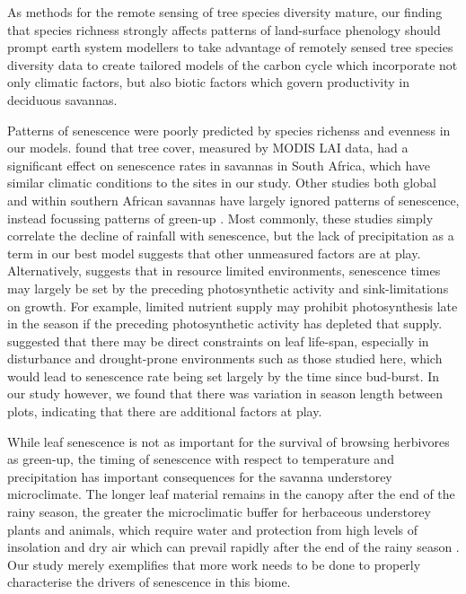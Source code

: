 \documentclass[11pt,a4paper]{article}
\begin{document}
As methods for the remote sensing of tree species diversity mature, our finding that species richness strongly affects patterns of land-surface phenology should prompt earth system modellers to take advantage of remotely sensed tree species diversity data to create tailored models of the carbon cycle which incorporate not only climatic factors, but also biotic factors which govern productivity in deciduous savannas. 

Patterns of senescence were poorly predicted by species richenss and evenness in our models. \citet{Cho2017} found that tree cover, measured by MODIS LAI data, had a significant effect on senescence rates in savannas in South Africa, which have similar climatic conditions to the sites in our study. Other studies both global and within southern African savannas have largely ignored patterns of senescence, instead focussing patterns of green-up \citep{Gallinat2015}. Most commonly, these studies simply correlate the decline of rainfall with senescence, but the lack of precipitation as a term in our best model suggests that other unmeasured factors are at play. Alternatively, \citet{Zani2020} suggests that in resource limited environments, senescence times may largely be set by the preceding photosynthetic activity and sink-limitations on growth. For example, limited nutrient supply may prohibit photosynthesis late in the season if the preceding photosynthetic activity has depleted that supply. \citet{Reich1992} suggested that there may be direct constraints on leaf life-span, especially in disturbance and drought-prone environments such as those studied here, which would lead to senescence rate being set largely by the time since bud-burst. In our study however, we found that there was variation in season length between plots, indicating that there are additional factors at play.

While leaf senescence is not as important for the survival of browsing herbivores as green-up, the timing of senescence with respect to temperature and precipitation has important consequences for the savanna understorey microclimate. The longer leaf material remains in the canopy after the end of the rainy season, the greater the microclimatic buffer for herbaceous understorey plants and animals, which require water and protection from high levels of insolation and dry air which can prevail rapidly after the end of the rainy season \citep{}. Our study merely exemplifies that more work needs to be done to properly characterise the drivers of senescence in this biome.
\end{document}
